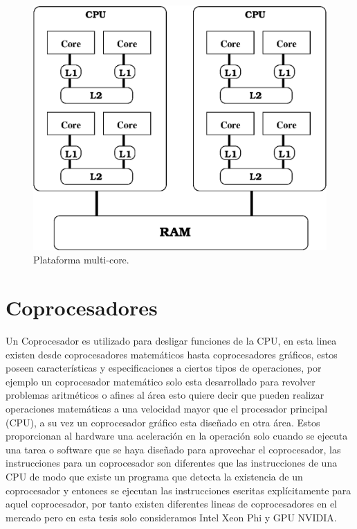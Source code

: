 \begin{figure}
\begin{center}
   \includegraphics[scale=0.5]{fig/plataforma.eps}
\end{center}
\caption{\label{fig:plataforma}Plataforma multi-core.}
\end{figure}


\section{Coprocesadores} \label{cap:coprocesadores}

Un Coprocesador es utilizado para desligar funciones de la CPU, en esta linea existen desde coprocesadores matemáticos hasta coprocesadores gráficos, estos poseen características y especificaciones a ciertos tipos de operaciones, por ejemplo un coprocesador matemático solo esta desarrollado para revolver problemas aritméticos o afines al área esto quiere decir que pueden realizar operaciones matemáticas a una velocidad mayor que el procesador principal (CPU), a su vez un coprocesador gráfico esta diseñado en otra área. Estos proporcionan al hardware una aceleración en la operación solo cuando se ejecuta una tarea o software que se haya diseñado para aprovechar el coprocesador, las instrucciones para un coprocesador son diferentes que las instrucciones de una CPU de modo que existe un programa que detecta la existencia de un coprocesador y entonces se ejecutan las instrucciones escritas explícitamente para aquel coprocesador, por tanto existen diferentes lineas de coprocesadores en el mercado pero en esta tesis solo consideramos Intel Xeon Phi y GPU NVIDIA.

